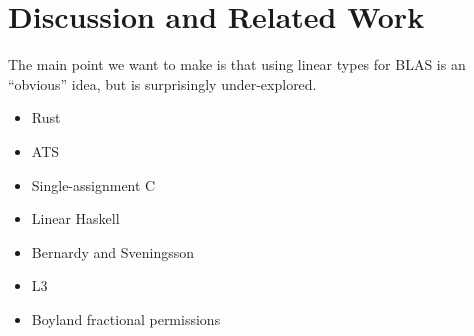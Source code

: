 \section{Discussion and Related Work}\label{sec:discussion_related_work}

The main point we want to make is that using linear types for BLAS
is an ``obvious'' idea, but is surprisingly under-explored. 

\begin{itemize}
\item Rust
\item ATS
\item Single-assignment C 
\item Linear Haskell
\item Bernardy and Sveningsson
\item L3
\item Boyland fractional permissions
\end{itemize}

